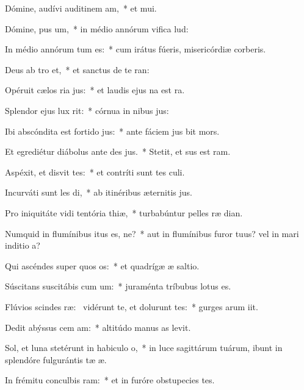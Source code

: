 \item Dómine, audívi auditinem am,~* et mui.
\item Dómine, pus um,~* in médio annórum vifica lud:
\item In médio annórum tum es:~* cum irátus fúeris, misericórdiæ corberis.
\item Deus ab tro et,~* et sanctus de te ran:
\item Opéruit cælos ria jus:~* et laudis ejus na est ra.
\item Splendor ejus  lux rit:~* córnua in nibus jus:
\item Ibi abscóndita est fortido jus:~* ante fáciem jus bit mors.
\item Et egrediétur diábolus ante des jus.~* Stetit, et sus est ram.
\item Aspéxit, et disvit tes:~* et contríti sunt tes culi.
\item Incurváti sunt les di,~* ab itinéribus æternitis jus.
\item Pro iniquitáte vidi tentória thiæ,~* turbabúntur pelles ræ dian.
\item Numquid in flumínibus itus es, ne?~* aut in flumínibus furor tuus? vel in mari inditio a?
\item Qui ascéndes super quos os:~* et quadrígæ æ saltio.
\item Súscitans suscitábis cum um:~* juraménta tríbubus  lotus es.
\item Flúvios scindes ræ:~\pscross{} vidérunt te, et dolurunt tes:~* gurges arum iit.
\item Dedit abýssus cem am:~* altitúdo manus as levit.
\item Sol, et luna stetérunt in habiculo o,~* in luce sagittárum tuárum, ibunt in splendóre fulgurántis tæ æ.
\item In frémitu conculbis ram:~* et in furóre obstupecies tes.
